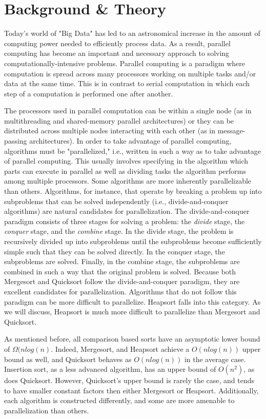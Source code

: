 \documentclass[conference]{IEEEtran}
\begin{document}
	\section{Background \& Theory}
	Today's world of "Big Data" has led to an astronomical increase in the amount of computing power needed to efficiently process data.
	As a result, parallel computing has become an important and necessary approach to solving computationally-intensive problems.
	Parallel computing is a paradigm where computation is spread across many processors working on multiple tasks and/or data at the same time. This is in contrast to serial computation in which each step of a computation is performed one after another.
	
	The processors used in parallel computation can be within a single node (as in multithreading and shared-memory parallel architectures) or they can be distributed across multiple nodes interacting with each other (as in message-passing architectures). In order to take advantage of parallel computing, algorithms must be "parallelized," i.e., written in such a way as to take advantage of parallel computing. This usually involves specifying in the algorithm which parts can execute in parallel as well as dividing tasks the algorithm performs among multiple processors. Some algorithms are more inherently parallelizable than others. Algorithms, for instance, that operate by breaking a problem up into subproblems that can be solved independently (i.e., divide-and-conquer algorithms) are natural candidates for parallelization. The divide-and-conquer paradigm consists of three stages for solving a problem: the \textit{divide} stage, the \textit{conquer} stage, and the \textit{combine} stage. In the divide stage, the problem is recursively divided up into subproblems until the subproblems become sufficiently simple such that they can be solved directly. In the conquer stage, the subproblems are solved. Finally, in the combine stage, the subproblems are combined in such a way that the original problem is solved. Because both Mergesort and Quicksort follow the divide-and-conquer paradigm, they are excellent candidates for parallelization. Algorithms that do not follow this paradigm can be more difficult to parallelize. Heapsort falls into this category. As we will discuss, Heapsort is much more difficult to parallelize than Mergesort and Quicksort.
	
	As mentioned before, all comparison based sorts have an asymptotic lower bound of $\Omega(nlog(n)$.
	Indeed,  Mergesort, and Heapsort achieve a $O(nlog(n))$ upper bound as well, and Quicksort behaves as $O(nlog(n))$ in the average case.
	Insertion sort, as a less advanced algorithm, has an upper bound of $O(n^2)$, as does Quicksort. \cite{cormen_introduction_2009}
	However, Quicksort's upper bound is rarely the case, and tends to have smaller constant factors then either Mergesort or Heapsort. \cite{hoare_algorithm_1961} %
	Additionally, each algorithm is constructed differently, and some are more amenable to parallelization than others.
	
\end{document}
